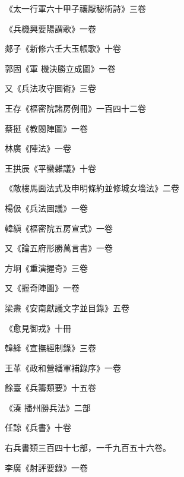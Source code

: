 \begin{pinyinscope}
 《太一行軍六十甲子禳厭秘術詩》三卷



 《兵機興要陽謂歌》一卷



 郯子《新修六壬大玉帳歌》十卷



 郭固《軍
 機決勝立成圖》一卷



 又《兵法攻守圖術》三卷



 王存《樞密院諸房例冊》一百四十二卷



 蔡挺《教閱陣圖》一卷



 林廣《陣法》一卷



 王拱辰《平蠻雜議》十卷



 《敵樓馬面法式及申明條約並修城女墻法》二卷



 楊伋《兵法圖議》一卷



 韓縝《樞密院五房宣式》一卷



 又《論五府形勝萬言書》一卷



 方坰《重演握奇》三卷



 又《握奇陣圖》一卷



 梁燾《安南獻議文字並目錄》五卷



 《愈見御戎》十冊



 韓絳《宣撫經制錄》三卷



 王革《政和營繕軍補錄序》一卷



 餘臺《兵籌類要》十五卷



 《溱
 播州勝兵法》二部



 任諒《兵書》十卷



 右兵書類三百四十七部，一千九百五十六卷。



 李廣《射評要錄》一卷




\end{pinyinscope}
